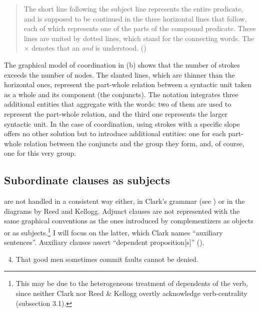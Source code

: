 \documentclass[output=paper]{langsci/langscibook}
\begin{document}
\begin{quote}
The short line following the subject line represents the entire predicate, and is supposed to be continued in the three horizontal lines that follow, each of which represents one of the parts of the compound predicate. These lines are united by dotted lines, which stand for the connecting words. The × denotes that an \textit{and} is understood. (\citealt[47-48]{reed_graded_1879})
\end{quote}

The graphical model of coordination in (b) shows that the number of strokes exceeds the number of nodes. The slanted lines, which are thinner than the horizontal ones, represent the part-whole relation between a syntactic unit taken as a whole and its component (the conjuncts). The notation integrates three additional entities that aggregate with the words: two of them are used to represent the part-whole relation, and the third one represents the larger syntactic unit. In the case of coordination, using strokes with a specific slope offers no other solution but to introduce additional entities: one for each part-whole relation between the conjuncts and the group they form, and, of course, one for this very group.

\subsection{Subordinate clauses as subjects}

 are not handled in a consistent way either, in Clark’s grammar  (see \citealt[319-322 and 328-329]{mazziotta_drawing_2016}) or in the diagrams by Reed and Kellogg. Adjunct clauses are not represented with the same graphical conventions as the ones introduced by complementizers as objects or as subjects.\footnote{ \textrm{This may be due to the heterogeneous treatment of dependents of the verb, since neither Clark nor Reed \& Kellogg overtly acknowledge verb-centrality (subsection 3.1).}} I will focus on the latter, which Clark names “auxiliary sentences”. Auxiliary clauses assert “dependent proposition[s]” (\citeyear[187]{clark_normal_1870}).

\ea%
    \begin{enumerate}\setcounter{enumi}{3}
    
    \label{ex:key:4}

        \item That good men sometimes commit faults cannot be denied.
    \end{enumerate}
\end{document}
